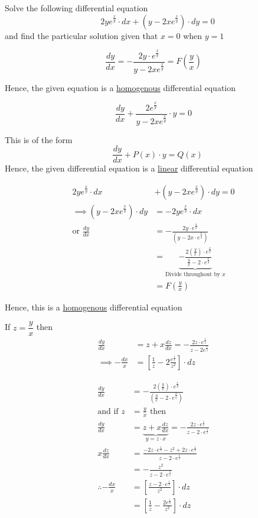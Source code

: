 \documentclass[14pt,fleqn]{extarticle}
\begin{document}
\newcommand\xy{\frac{x}{y}}
\newcommand\yx{\frac{y}{x}}
\newcommand\ebz{e^{\frac{1}{z}}}
\newcommand\ez{e^z}


Solve the following differential equation 
\[ \quad 2y e^\xy\cdot dx + \left(y - 2xe^\xy \right)\cdot dy = 0 \]
and find the particular solution given that $x =0$ when $y=1$

\newcard 
%
\[ \frac{dy}{dx} = -\frac{2y\cdot e^\xy}{y - 2xe^\xy} = F \left(\frac{y}{x} \right)\]

Hence, the given equation is a \underline{homogenous} differential equation 

\newcard 

\[ \frac{dy}{dx} + \frac{2e^\xy}{y-2x e^\xy}\cdot y = 0 \]

This is of the form 
\[ \quad \frac{dy}{dx} + P(x)\cdot y = Q(x) \]
Hence, the given differential equation is a \underline{linear} differential equation

\newcard
\smallmath 
\begin{align}
	2y e^\xy\cdot dx &+ \left(y - 2xe^\xy \right)\cdot dy  = 0  \\
	\implies \left(y-2x e^\xy \right)\cdot dy  &= -2y e^\xy\cdot dx \\
	\text{or }\frac{dy}{dx} &= -\frac{2y\cdot e^\xy}{\left(y-2x\cdot e^\xy \right)} \\
	&= \underbrace{-\frac{2 \left(\yx \right)\cdot e^\xy}{\yx - 2\cdot e^\xy}}_{\text{Divide throughout by $x$}} \\
	&= F \left(\yx \right)
\end{align}

Hence, this is a \underline{homogenous} differential equation 

\newcard 


If $z = \dfrac{y}{x}$ then 
\begin{align}
	\frac{dy}{dx} &= z + x \frac{dz}{dx} = - \frac{2z\cdot \ebz}{z - 2\ebz} \\
	\implies -\frac{dx}{x} &= \left[\frac{1}{z} - 2 \frac{\ebz}{z^2} \right] \cdot dz
	\end{align} 

\newcard 

\begin{align}
	\frac{dy}{dx} &= -\frac{2\left(\yx \right)\cdot e^\xy}{\left( \yx - 2\cdot e^\xy\right) } \\
	\text{and if } z &= \yx \text{ then } \\
	\frac{dy}{dx} &= \underbrace{z + x\frac{dz}{dx}}_{ y = z\cdot x} = - \frac{2z\cdot \ebz}{z - 2\cdot \ebz} \\
	x \frac{dz}{dx} &= \frac{-2z\cdot \ebz -z^2 + 2z\cdot\ebz}{z-2\cdot \ebz} \\
	&= -\frac{z^2}{z-2\cdot\ebz} \\
	\therefore -\frac{dx}{x} &= \left[\frac{z-2\cdot \ebz}{z^2} \right]\cdot dz \\
	&= \left[\frac{1}{z} - \frac{2\ebz}{z^2} \right]\cdot dz
\end{align}
\end{document}
